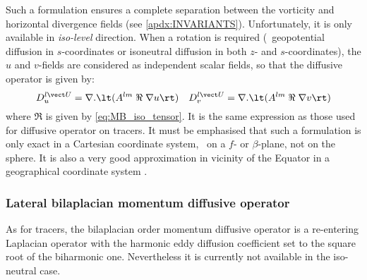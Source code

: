 \documentclass[../main/NEMO_manual]{subfiles}
\begin{document}
Such a formulation ensures a complete separation between
the vorticity and horizontal divergence fields (see \autoref{apdx:INVARIANTS}).
Unfortunately, it is only available in \textit{iso-level} direction.
When a rotation is required
(\ie\ geopotential diffusion in $s$-coordinates or
isoneutral diffusion in both $z$- and $s$-coordinates),
the $u$ and $v$-fields are considered as independent scalar fields,
so that the diffusive operator is given by:
\[
    D_u^{l \vect U} = \nabla . \lt( A^{lm} \; \Re \; \nabla u \rt) \quad
    D_v^{l \vect U} = \nabla . \lt( A^{lm} \; \Re \; \nabla v \rt)
\]
where $\Re$ is given by \autoref{eq:MB_iso_tensor}.
It is the same expression as those used for diffusive operator on tracers.
It must be emphasised that such a formulation is only exact in a Cartesian coordinate system,
\ie\ on a $f$- or $\beta$-plane, not on the sphere.
It is also a very good approximation in vicinity of the Equator in
a geographical coordinate system \citep{lengaigne.madec.ea_JGR03}.

\subsubsection{Lateral bilaplacian momentum diffusive operator}

As for tracers,
the bilaplacian order momentum diffusive operator is a re-entering Laplacian operator with
the harmonic eddy diffusion coefficient set to the square root of the biharmonic one.
Nevertheless it is currently not available in the iso-neutral case.

\subinc{}
\end{document}

